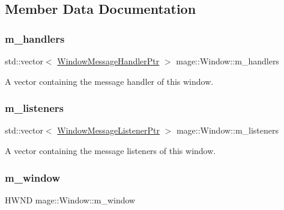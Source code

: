 \subsection{Member Data Documentation}
\mbox{\label{classmage_1_1_window_a7438964a7b8c196d84da24cf789e5bd9}} 
\subsubsection{\texorpdfstring{m\+\_\+handlers}{m\_handlers}}
{\footnotesize\ttfamily std\+::vector$<$ \mbox{\hyperlink{classmage_1_1_window_add1d792fb9f71e70d4fb07409d80cfdd}{Window\+Message\+Handler\+Ptr}} $>$ mage\+::\+Window\+::m\+\_\+handlers\hspace{0.3cm}{\ttfamily [private]}}

A vector containing the message handler of this window. \mbox{\label{classmage_1_1_window_a28aab68439dc39058a7e507b0cd8c60b}} 
\subsubsection{\texorpdfstring{m\+\_\+listeners}{m\_listeners}}
{\footnotesize\ttfamily std\+::vector$<$ \mbox{\hyperlink{classmage_1_1_window_a0e0a4f2a3f6db176f6aec454b94a06fb}{Window\+Message\+Listener\+Ptr}} $>$ mage\+::\+Window\+::m\+\_\+listeners\hspace{0.3cm}{\ttfamily [private]}}

A vector containing the message listeners of this window. \mbox{\label{classmage_1_1_window_a5ca72a18801ff9e6abc309949d7b08b4}} 
\subsubsection{\texorpdfstring{m\+\_\+window}{m\_window}}
{\footnotesize\ttfamily H\+W\+ND mage\+::\+Window\+::m\+\_\+window\hspace{0.3cm}{\ttfamily [private]}}

